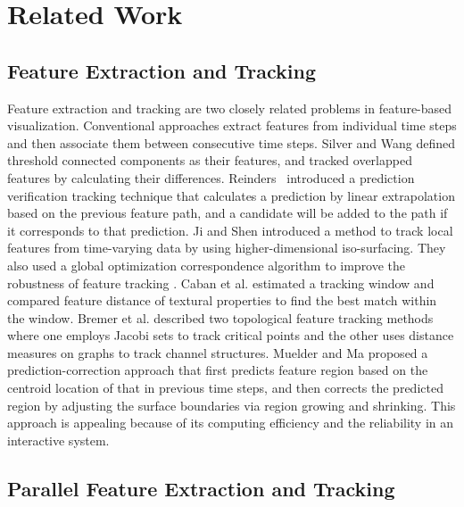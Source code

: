 \section{Related Work}

\subsection{Feature Extraction and Tracking}

Feature extraction and tracking are two closely related problems in feature-based visualization. Conventional approaches extract features from individual time steps and then associate them between consecutive time steps. Silver and Wang \cite{Silver:1997:TVT:614266.614369} defined threshold connected components as their features, and tracked overlapped features by calculating their differences.
Reinders~\cite{Reinders2001} introduced a prediction verification tracking technique that calculates a prediction by linear extrapolation based on the previous feature path, and a candidate will be added to the path if it corresponds to that prediction. Ji and Shen \cite{Ji2003} introduced a method to track local features from time-varying data by using higher-dimensional iso-surfacing. They also used a global optimization correspondence algorithm to improve the robustness of feature tracking \cite{Ji2006}. Caban et al. \cite{Caban2007} estimated a tracking window and compared feature distance of textural properties to find the best match within the window. Bremer et al. \cite{Bremer2007} described two topological feature tracking methods where one employs Jacobi sets to track critical points and the other uses distance measures on graphs to track channel structures.
Muelder and Ma \cite{Muelder2009} proposed a prediction-correction approach that first predicts feature region based on the centroid location of that in previous time steps, and then corrects the predicted region by adjusting the surface boundaries via region growing and shrinking. This approach is appealing because of its computing efficiency and the reliability in an interactive system.

\subsection{Parallel Feature Extraction and Tracking}

